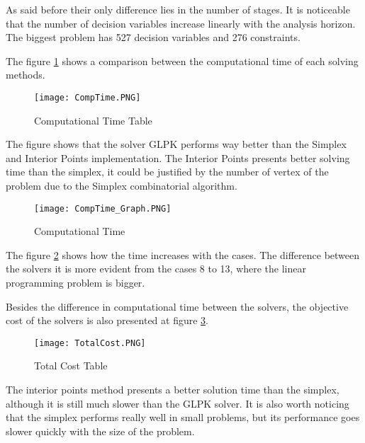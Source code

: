 \documentclass[a4paper]{IEEEtran}
\begin{document}
As said before their only difference lies in the number of stages. It is noticeable that the number of decision variables increase linearly with the analysis horizon. The biggest problem has 527 decision variables and 276 constraints.

The figure \ref{fig:timetab} shows a comparison between the computational time of each solving methods.
\begin{figure}[H]
	\centering
	\texttt{[image: CompTime.PNG]}
	\caption{Computational Time Table}
	\label{fig:timetab}
\end{figure}

The figure shows that the solver GLPK performs way better than the Simplex and Interior Points implementation. The Interior Points presents better solving time than the simplex, it could be justified by the number of vertex of the problem due to the Simplex combinatorial algorithm. 
 
\begin{figure}[H]
	\centering
	\texttt{[image: CompTime\_Graph.PNG]}
	\caption{Computational Time}
	\label{fig:time}
\end{figure}

The figure \ref{fig:time} shows how the time increases with the cases. The difference between the solvers it is more evident from the cases 8 to 13, where the linear programming problem is bigger.

Besides the difference in computational time between the solvers, the objective cost of the solvers is also presented at figure \ref{fig:costtab}.
\begin{figure}[H]
	\centering
	\texttt{[image: TotalCost.PNG]}
	\caption{Total Cost Table}
	\label{fig:costtab}
\end{figure}

The interior points method presents a better solution time than the simplex, although it is still much slower than the GLPK solver. It is also worth noticing that the simplex performs really well in small problems, but its performance goes slower quickly with the size of the problem.
\end{document}
